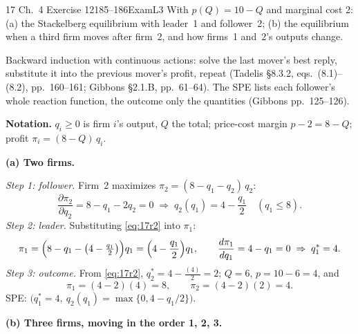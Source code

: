 \begin{exsol}{17}{\MG{} Ch.~4 Exercise 12}{185--186}{Exam}{L3}
\asked With $p(Q) = 10 - Q$ and marginal cost 2: (a) the Stackelberg equilibrium with leader~1 and
follower~2; (b) the equilibrium when a third firm moves after firm~2, and how firms~1 and~2's
outputs change.

\method Backward induction with continuous actions: solve the last mover's best reply, substitute
it into the previous mover's profit, repeat (Tadelis \S8.3.2, eqs.~(8.1)--(8.2), pp.~160--161;
Gibbons \S2.1.B, pp.~61--64). The SPE lists each follower's whole reaction function, the outcome
only the quantities (Gibbons pp.~125--126).

\solution
\textbf{Notation.} $q_i \ge 0$ is firm $i$'s output, $Q$ the total; price-cost margin
$p - 2 = 8 - Q$; profit $\pi_i = (8 - Q)\,q_i$.

\textbf{(a) Two firms.}

\emph{Step 1: follower.} Firm~2 maximizes $\pi_2 = (8 - q_1 - q_2)\,q_2$:
\begin{equation}
  \frac{\partial \pi_2}{\partial q_2} = 8 - q_1 - 2q_2 = 0
  \;\Rightarrow\; q_2(q_1) = 4 - \frac{q_1}{2}\quad (q_1 \le 8). \label{eq:17r2}
\end{equation}
\emph{Step 2: leader.} Substituting \eqref{eq:17r2} into $\pi_1$:
\[
  \pi_1 = \Bigl(8 - q_1 - \bigl(4 - \tfrac{q_1}{2}\bigr)\Bigr) q_1
        = \Bigl(4 - \frac{q_1}{2}\Bigr) q_1 ,
  \qquad \frac{d\pi_1}{dq_1} = 4 - q_1 = 0 \;\Rightarrow\; q_1^* = 4 .
\]
\emph{Step 3: outcome.} From \eqref{eq:17r2}, $q_2^* = 4 - \frac{(4)}{2} = 2$; $Q = 6$,
$p = 10 - 6 = 4$, and
\[
  \pi_1 = (4 - 2)(4) = 8, \qquad \pi_2 = (4 - 2)(2) = 4 .
\]
SPE: $\bigl(q_1^* = 4,\ q_2(q_1) = \max\{0, 4 - q_1/2\}\bigr)$.

\textbf{(b) Three firms, moving in the order 1, 2, 3.}


\end{exsol}
